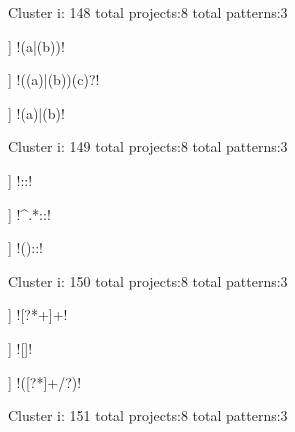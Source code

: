 Cluster i: 148
total projects:8
total patterns:3
\begin{multicols}{1}
\begin{description}[noitemsep,topsep=0pt]
\item [[8] ] \cverb!(a|(b))!
\item [[8] ] \cverb!((a)|(b))(c)?!
\item [[7] ] \cverb!(a)|(b)!
\end{description}
\end{multicols}







Cluster i: 149
total projects:8
total patterns:3
\begin{multicols}{1}
\begin{description}[noitemsep,topsep=0pt]
\item [[6] ] \cverb!::!
\item [[4] ] \cverb!^.*::!
\item [[2] ] \cverb!\s*(\w*)\s*::!
\end{description}
\end{multicols}







Cluster i: 150
total projects:8
total patterns:3
\begin{multicols}{1}
\begin{description}[noitemsep,topsep=0pt]
\item [[4] ] \cverb![?*+]+!
\item [[2] ] \cverb![\*\?]!
\item [[2] ] \cverb!([?*]+/?)!
\end{description}
\end{multicols}







Cluster i: 151
total projects:8
total patterns:3
\begin{multicols}{1}
\end{multicols}







